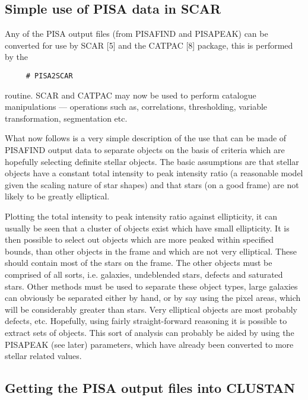 \subsection{Simple use of PISA data in SCAR}

Any of the PISA output files (from PISAFIND and PISAPEAK) can be
converted for use by SCAR [5] and the CATPAC [8] package, this is
performed by the
\begin{verbatim}
     # PISA2SCAR
\end{verbatim}
routine. SCAR and CATPAC may now be used to perform catalogue manipulations
--- operations such as, correlations, thresholding, variable transformation,
segmentation etc.

What now follows is a very simple description of the use that can be made of
PISAFIND output data to separate objects on the basis of criteria which are
hopefully selecting definite stellar objects. The basic assumptions
are that stellar objects have a constant total intensity to peak intensity
ratio (a reasonable model given the scaling nature of star shapes) and that
stars (on a good frame) are not likely to be greatly elliptical. 

Plotting the total intensity to peak intensity ratio against ellipticity,
it can usually be seen that a cluster of objects exist which have small
ellipticity. It is then possible to select out objects which are more
peaked within specified bounds, than other objects in the frame and
which are not very elliptical. These should contain most of the stars on
the frame. The other objects must be comprised of all sorts, i.e.
galaxies, undeblended stars, defects and saturated stars. Other methods
must be used to separate these object types, large galaxies can
obviously be separated either by hand, or by say using the pixel areas,
which will be considerably greater than stars. Very elliptical objects
are most probably defects, etc. Hopefully, using fairly straight-forward
reasoning it is possible to extract sets of objects. This sort of
analysis can probably be aided by using the PISAPEAK (see later)
parameters, which have already been converted to more stellar related
values.

\subsection{Getting the PISA output files into CLUSTAN}

